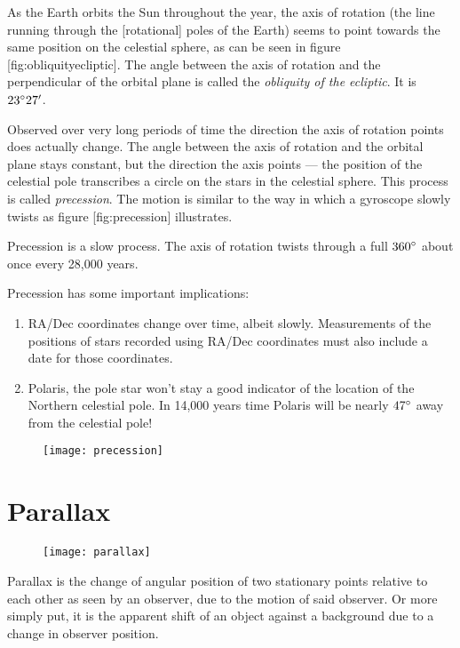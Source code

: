 As the Earth orbits the Sun throughout the year, the axis of rotation
(the line running through the {[}rotational{]} poles of the Earth) seems
to point towards the same position on the celestial sphere, as can be
seen in figure {[}fig:obliquityecliptic{]}. The angle between the axis
of rotation and the perpendicular of the orbital plane is called the
\emph{obliquity of the ecliptic}. It is $23\degree27'$.

Observed over very long periods of time the direction the axis of
rotation points does actually change. The angle between the axis of
rotation and the orbital plane stays constant, but the direction the
axis points --- the position of the celestial pole transcribes a circle
on the stars in the celestial sphere. This process is called
\emph{precession}. The motion is similar to the way in which a gyroscope
slowly twists as figure {[}fig:precession{]} illustrates.

Precession is a slow process. The axis of rotation twists through a full
$360\degree$ about once every 28,000 years.

Precession has some important implications:

\begin{enumerate}
\item
  RA/Dec coordinates change over time, albeit slowly. Measurements of
  the positions of stars recorded using RA/Dec coordinates must also
  include a date for those coordinates.
\item
  Polaris, the pole star won't stay a good indicator of the location of
  the Northern celestial pole. In 14,000 years time Polaris will be
  nearly $47\degree$ away from the celestial pole!
\end{enumerate}

\begin{figure}[h]
\centering\texttt{[image: precession]}
\end{figure}

\section{Parallax}\label{parallax}

\begin{figure}[h]
\centering\texttt{[image: parallax]}
\end{figure}

Parallax is the change of angular position of two stationary points
relative to each other as seen by an observer, due to the motion of said
observer. Or more simply put, it is the apparent shift of an object
against a background due to a change in observer position.


